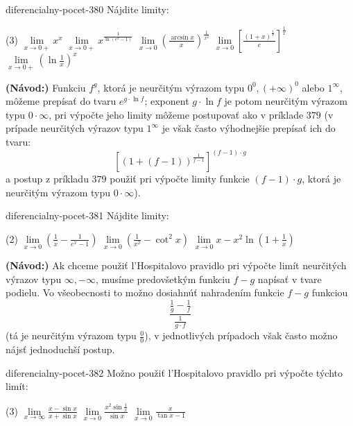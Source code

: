 \begin{defproblem}{diferencialny-pocet-380}
Nájdite limity:
\begin{tasks}(3)
  \task $\lim\limits_{x \rightarrow 0+}x^x$
  \task $\lim\limits_{x \rightarrow 0+}x^{\frac{1}{\ln (e^x-1)}}$
  \task $\lim\limits_{x \rightarrow 0}(\frac{\arcsin x}{x})^{\frac{1}{x^2}}$
  \task $\lim\limits_{x \rightarrow 0}[\frac{(1+x)^{\frac{1}{x}}}{e}]^{\frac{1}{x}}$
  \task $\lim\limits_{x \rightarrow 0+}(\ln \frac{1}{x})^x$
\end{tasks}

\begin{solution}
  \textbf{(Návod:)}
  Funkciu $f^g$, ktorá je neurčitým výrazom typu $0^0,(+\infty)^0$ alebo
  $1^{\infty}$, môžeme prepísať do tvaru $e^{g\cdot\ln f}$; exponent $g\cdot\ln
  f$ je potom neurčitým výrazom typu $0\cdot\infty$, pri výpočte jeho limity
  môžeme postupovať ako v príklade $379$ (v prípade neurčitých výrazov typu
  $1^{\infty}$ je však často výhodnejšie prepísať ich do tvaru:
  \[
    [(1+(f-1))^{\frac{1}{f-1}}]^{(f-1)\cdot g}
  \]
  a postup z príkladu $379$ použiť pri výpočte limity funkcie $(f-1)\cdot g$,
  ktorá je neurčitým výrazom typu $0\cdot\infty$).
\end{solution}
\end{defproblem}

\begin{defproblem}{diferencialny-pocet-381}
Nájdite limity:
\begin{tasks}(2)
  \task $\lim\limits_{x \rightarrow 0}(\frac{1}{x}-\frac{1}{e^x-1})$
  \task $\lim\limits_{x \rightarrow 0}(\frac{1}{x^2}-\cot^2 x)$
  \task $\lim\limits_{x \rightarrow 0}x-x^2\ln (1+\frac{1}{x})$
\end{tasks}

\begin{solution}
  \textbf{(Návod:)}
  Ak chceme použiť l'Hospitalovo pravidlo pri výpočte limít neurčitých výrazov
  typu $\infty,-\infty$, musíme predovšetkým funkciu $f-g$ napísať v tvare
  podielu. Vo všeobecnosti to možno dosiahnúť nahradením funkcie $f-g$ funkciou
  \[
    \frac{\frac{1}{g}-\frac{1}{f}}{\frac{1}{g\cdot f}}
  \]
  (tá je neurčitým výrazom typu $\frac{0}{0}$), v jednotlivých prípadoch však
  často možno nájsť jednoduchší postup.
\end{solution}
\end{defproblem}

\begin{defproblem}{diferencialny-pocet-382}
Možno použiť l'Hospitalovo pravidlo pri výpočte týchto limít:
\begin{tasks}(3)
  \task $\lim\limits_{x \rightarrow \infty}\frac{x-\sin x}{x+\sin x}$
  \task $\lim\limits_{x \rightarrow 0}\frac{x^2\sin \frac{1}{x}}{\sin x}$
  \task $\lim\limits_{x \rightarrow 0}\frac{x}{\tan x -1}$
\end{tasks}
\end{defproblem}

